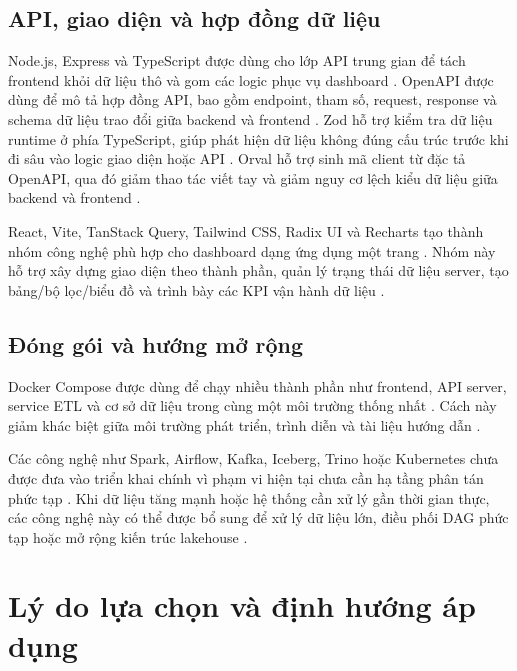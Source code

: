 \documentclass[12pt,a4paper]{article}
\begin{document}
\subsection{API, giao diện và hợp đồng dữ liệu}

Node.js, Express và TypeScript được dùng cho lớp API trung gian để tách frontend khỏi dữ liệu thô và gom các logic phục vụ dashboard \cite{nodeAbout}. OpenAPI được dùng để mô tả hợp đồng API, bao gồm endpoint, tham số, request, response và schema dữ liệu trao đổi giữa backend và frontend \cite{openapiSpec}. Zod hỗ trợ kiểm tra dữ liệu runtime ở phía TypeScript, giúp phát hiện dữ liệu không đúng cấu trúc trước khi đi sâu vào logic giao diện hoặc API \cite{zodDocs}. Orval hỗ trợ sinh mã client từ đặc tả OpenAPI, qua đó giảm thao tác viết tay và giảm nguy cơ lệch kiểu dữ liệu giữa backend và frontend \cite{orvalDocs}.\par

React, Vite, TanStack Query, Tailwind CSS, Radix UI và Recharts tạo thành nhóm công nghệ phù hợp cho dashboard dạng ứng dụng một trang \cite{reactDocs}. Nhóm này hỗ trợ xây dựng giao diện theo thành phần, quản lý trạng thái dữ liệu server, tạo bảng/bộ lọc/biểu đồ và trình bày các KPI vận hành dữ liệu \cite{tableauKpi}.\par

\subsection{Đóng gói và hướng mở rộng}

Docker Compose được dùng để chạy nhiều thành phần như frontend, API server, service ETL và cơ sở dữ liệu trong cùng một môi trường thống nhất \cite{dockerCompose}. Cách này giảm khác biệt giữa môi trường phát triển, trình diễn và tài liệu hướng dẫn \cite{dockerMultiContainer}.\par

Các công nghệ như Spark, Airflow, Kafka, Iceberg, Trino hoặc Kubernetes chưa được đưa vào triển khai chính vì phạm vi hiện tại chưa cần hạ tầng phân tán phức tạp \cite{sparkDocs}. Khi dữ liệu tăng mạnh hoặc hệ thống cần xử lý gần thời gian thực, các công nghệ này có thể được bổ sung để xử lý dữ liệu lớn, điều phối DAG phức tạp hoặc mở rộng kiến trúc lakehouse \cite{airflowDocs}.\par

\section{Lý do lựa chọn và định hướng áp dụng}
\end{document}

